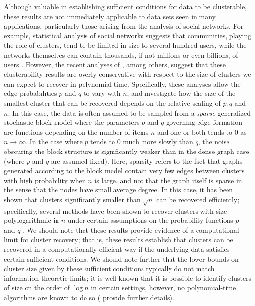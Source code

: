 \documentclass[twoside,11pt]{article}
\newcommand{\0}{\bs{0}}
\newcommand{\ra}{\rightarrow}
\begin{document}
Although valuable in establishing sufficient conditions for data to be clusterable, these results are not immediately
applicable to data sets seen in many applications, particularly those arising from the analysis of social networks.
For example, statistical analysis of social networks suggests that communities, playing the role of clusters,
tend to be limited in size to several hundred users, while the networks themselves can contain thousands, if not millions or even billions,
of users \citep{leskovec2008statistical, leskovec2009community}.
However, the recent analyses of \cite{chen2014clustering,chen2014statistical, guedon2015community,jalali2015relative, rohe2012highest}, among others, suggest that these clusterability results are overly
conservative with respect to the size of clusters we can expect to recover in polynomial-time.
Specifically, these analyses allow the edge probabilities $p$ and
$q$ to vary with $n$, and investigate how the size of the smallest cluster
that can be recovered depends on the relative scaling of $p,q$ and $n$.
In this case, the data is often assumed to be sampled from a \emph{sparse} generalized stochastic block model where the parameters
\(p\) and \(q\) governing edge formation are functions depending on the number of items \(n\) and one
or both tends to \(0\) as \(n \ra \infty\). In the case where \(p \) tends to \(0\) much more slowly than \(q\), the noise
obscuring the block structure is significantly weaker than in the dense graph case (where \(p\) and \(q\) are assumed fixed).
Here, sparsity refers to the fact that graphs
generated according to the block model contain very few edges
between
clusters with high probability when $n$ is large,
and not that the graph itself is sparse in the sense that the nodes
have small average degree.
In this %
case, it has been shown that clusters significantly smaller than
\(\sqrt{n}\) can be recovered efficiently;
specifically, several methods have been shown to recover clusters with size polylogarithmic in \(n\)
under certain assumptions on the probability functions \(p\) and \(q\)  \citep[see][]{chen2014clustering,chen2014statistical, guedon2015community,rohe2012highest}.
We should note that these results provide evidence of a computational limit for cluster recovery; that is, these results establish that clusters can be recovered in a computationally efficient way if the underlying data satisfies certain sufficient conditions. We should note further that the lower bounds on cluster size given by these sufficient conditions typically do not match information-theoretic limits; it is well-known that it is possible to identify clusters of size on the order of $\log n$ in certain settings, however, no polynomial-time algorithms are known to do so (\citealt{chen2014statistical, hajek2015achieving} provide further details).
\end{document}
